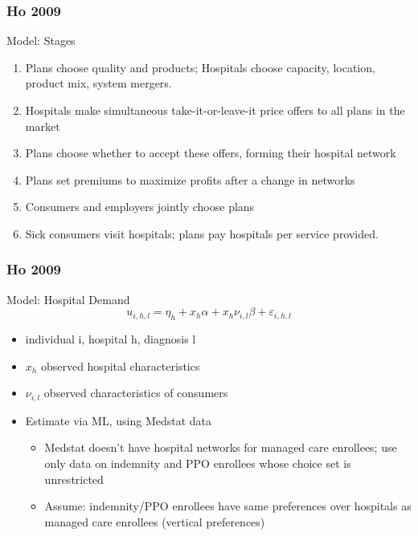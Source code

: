 \begin{frame}
\frametitle{Ho 2009}

Model: Stages
\begin{enumerate}
\item Plans choose quality and products; Hospitals choose capacity, location, product mix, system mergers.
\item Hospitals make simultaneous take-it-or-leave-it price offers to all plans in the market
\item Plans choose whether to accept these offers, forming their hospital network
\item Plans set premiums to maximize profits after a change in networks
\item Consumers and employers jointly choose plans
\item Sick consumers visit hospitals; plans pay hospitals per service provided.
\end{enumerate}
\end{frame}
\begin{frame}
\frametitle{Ho 2009}

Model: Hospital Demand
\[
u_{i,h,l}=\eta _{h}+x_{h}\alpha +x_{h}\nu _{i,l}\beta +\varepsilon _{i,h,l}
\]

\begin{itemize}
\item individual i, hospital h, diagnosis l
\item $x_{h}$ observed hospital characteristics
\item $\nu_{i,l}$ observed characteristics of consumers
\item Estimate via ML, using Medstat data
\begin{itemize}
\item Medstat doesn't have hospital networks for managed care enrollees; use only data on indemnity and PPO enrollees whose choice set is unrestricted
\item Assume: indemnity/PPO enrollees have same preferences over hospitals as managed care enrollees (vertical preferences)
\end{itemize}
\end{itemize}

\end{frame}

